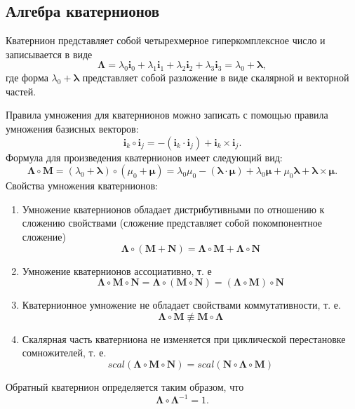 \documentclass{article}
\begin{document}
\subsection{Алгебра кватернионов}
Кватернион представляет собой четырехмерное гиперкомплексное число и
записывается в виде
$$
\mathbf{\Lambda} = \lambda_0 \mathbf{i}_0 + \lambda_1 \mathbf{i}_1 + \lambda_2
\mathbf{i}_2 + \lambda_3 \mathbf{i}_3 = \lambda_0 + \mathbf{\lambda},
$$
где форма $\lambda_0 + \mathbf{\lambda}$ представляет собой разложение в виде
скалярной и векторной частей.

Правила умножения для кватернионов можно записать с помощью правила умножения
базисных векторов:
$$
\mathbf{i}_k\circ\mathbf{i}_j = -\left(\mathbf{i}_k \cdot\mathbf{i}_j\right) +
\mathbf{i}_k\times\mathbf{i}_j.
$$
Формула для произведения кватернионов имеет следующий вид:
$$
\mathbf{\Lambda}\circ\mathbf{M} = \left(\lambda_0
+\mathbf{\lambda}\right)\circ\left(\mu_0 + \mathbf{\mu}\right) = 
\lambda_0\mu_0 -\left(\mathbf{\lambda}\cdot\mathbf{\mu}\right) +
\lambda_0\mathbf{\mu} + \mu_0\mathbf{\lambda} +
    \mathbf{\lambda}\times\mathbf{\mu}.
$$
Свойства умножения кватернионов:
\begin{enumerate}
\item Умножение кватернионов обладает дистрибутивными по отношению к сложению
    свойствами (сложение представляет собой покомпонентное сложение)
$$
\mathbf{\Lambda}\circ\left(\mathbf{M} + \mathbf{N}\right) =
\mathbf{\Lambda}\circ\mathbf{M} +
\mathbf{\Lambda}\circ\mathbf{N}
$$
\item Умножение кватернионов ассоциативно, т. е
$$
\mathbf{\Lambda}\circ\mathbf{M}\circ\mathbf{N} = 
\mathbf{\Lambda}\circ\left(\mathbf{M}\circ\mathbf{N}\right) = 
\left(\mathbf{\Lambda}\circ\mathbf{M}\right)\circ\mathbf{N} 
$$
\item Кватернионное умножение не обладает свойствами коммутативности, т. е.
$$
\mathbf{\Lambda}\circ\mathbf{M}\not\equiv\mathbf{M}\circ\mathbf{\Lambda}
$$
\item Скалярная часть кватерниона не изменяется при циклической перестановке
сомножителей, т. е. 
$$
scal\left(\mathbf{\Lambda}\circ\mathbf{M}\circ\mathbf{N}\right) =
scal\left(\mathbf{N}\circ\mathbf{\Lambda}\circ\mathbf{M}\right)
$$
\end{enumerate}

Обратный кватернион определяется таким образом, что
$$
\mathbf{\Lambda}\circ\mathbf{\Lambda}^{-1} = 1.
$$
\end{document}
